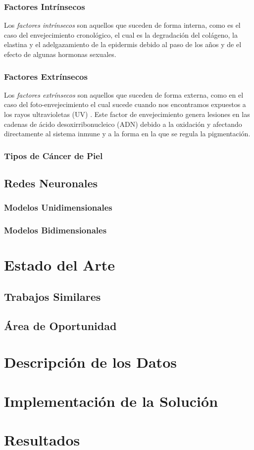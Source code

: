 \subsection{Factores Intrínsecos}
Los \emph{factores intrínsecos} son aquellos que suceden de forma interna, como es el caso del envejecimiento cronológico, el cual es la degradación del colágeno, la elastina y el adelgazamiento de la epidermis debido al paso de los años y de el efecto de algunas hormonas sexuales.

\subsection{Factores Extrínsecos}
Los \emph{factores extrínsecos} son aquellos que suceden de forma externa, como en el caso del foto-envejecimiento el cual sucede cuando nos encontramos expuestos a los rayos ultravioletas (UV) \citep{skin_aging}. Este factor de envejecimiento genera lesiones en las cadenas de ácido desoxirribonucleico (ADN) debido a la oxidación y afectando directamente al sistema inmune y a la forma en la que se regula la pigmentación.

\subsection{Tipos de Cáncer de Piel}

\section{Redes Neuronales}
\subsection{Modelos Unidimensionales}
\subsection{Modelos Bidimensionales}

\chapter{Estado del Arte}
\section{Trabajos Similares}
\section{Área de Oportunidad}

\chapter{Descripción de los Datos}


\chapter{Implementación de la Solución}

\chapter{Resultados}

